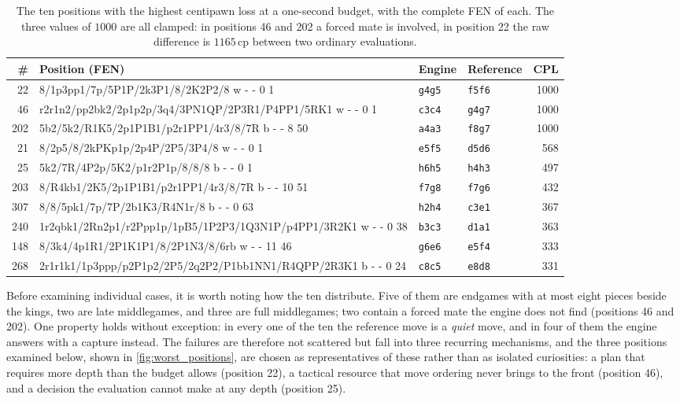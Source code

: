 \begin{table}[ht]
\centering
\small
\setlength{\tabcolsep}{4pt}
\begin{tabular}{@{}rlllr@{}}
\toprule
\# & Position (FEN) & Engine & Reference & CPL \\ \midrule
 22 & {\ttfamily\scriptsize 8/1p3pp1/7p/5P1P/2k3P1/8/2K2P2/8 w - - 0 1} & \texttt{g4g5} & \texttt{f5f6} & 1000 \\
 46 & {\ttfamily\scriptsize r2r1n2/pp2bk2/2p1p2p/3q4/3PN1QP/2P3R1/P4PP1/5RK1 w - - 0 1} & \texttt{c3c4} & \texttt{g4g7} & 1000 \\
202 & {\ttfamily\scriptsize 5b2/5k2/R1K5/2p1P1B1/p2r1PP1/4r3/8/7R b - - 8 50} & \texttt{a4a3} & \texttt{f8g7} & 1000 \\
 21 & {\ttfamily\scriptsize 8/2p5/8/2kPKp1p/2p4P/2P5/3P4/8 w - - 0 1} & \texttt{e5f5} & \texttt{d5d6} & 568 \\
 25 & {\ttfamily\scriptsize 5k2/7R/4P2p/5K2/p1r2P1p/8/8/8 b - - 0 1} & \texttt{h6h5} & \texttt{h4h3} & 497 \\
203 & {\ttfamily\scriptsize 8/R4kb1/2K5/2p1P1B1/p2r1PP1/4r3/8/7R b - - 10 51} & \texttt{f7g8} & \texttt{f7g6} & 432 \\
307 & {\ttfamily\scriptsize 8/8/5pk1/7p/7P/2b1K3/R4N1r/8 b - - 0 63} & \texttt{h2h4} & \texttt{c3e1} & 367 \\
240 & {\ttfamily\scriptsize 1r2qbk1/2Rn2p1/r2Ppp1p/1pB5/1P2P3/1Q3N1P/p4PP1/3R2K1 w - - 0 38} & \texttt{b3c3} & \texttt{d1a1} & 363 \\
148 & {\ttfamily\scriptsize 8/3k4/4p1R1/2P1K1P1/8/2P1N3/8/6rb w - - 11 46} & \texttt{g6e6} & \texttt{e5f4} & 333 \\
268 & {\ttfamily\scriptsize 2r1r1k1/1p3ppp/p2P1p2/2P5/2q2P2/P1bb1NN1/R4QPP/2R3K1 b - - 0 24} & \texttt{c8c5} & \texttt{e8d8} & 331 \\
\bottomrule
\end{tabular}
\caption{The ten positions with the highest centipawn loss at a one-second
budget, with the complete FEN of each. The three values of $1000$ are all
clamped: in positions 46 and 202 a forced mate is involved, in position 22 the
raw difference is $1165$\,cp between two ordinary evaluations.}
\label{tab:worst_positions}
\end{table}

Before examining individual cases, it is worth noting how the ten distribute.
Five of them are endgames with at most eight pieces beside the kings, two are
late middlegames, and three are full middlegames; two contain a forced mate the
engine does not find (positions 46 and 202). One property holds without
exception: in every one of the ten the reference move is a \emph{quiet} move, and
in four of them the engine answers with a capture instead. The failures are
therefore not scattered but fall into three recurring mechanisms, and the three
positions examined below, shown in \cref{fig:worst_positions}, are chosen as
representatives of these rather than as isolated curiosities: a plan that requires
more depth than the budget allows (position 22), a tactical resource that move
ordering never brings to the front (position 46), and a decision the evaluation
cannot make at any depth (position 25).

